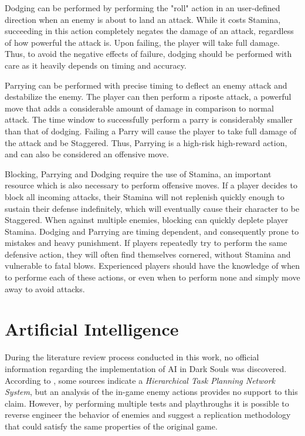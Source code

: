 Dodging can be performed by performing the "roll" action in an user-defined direction when an enemy is about to land an attack. While it costs Stamina, succeeding in this action completely negates the damage of an attack, regardless of how powerful the attack is. Upon failing, the player will take full damage. Thus, to avoid the negative effects of failure, dodging should be performed with care as it heavily depends on timing and accuracy.

Parrying can be performed with precise timing to deflect an enemy attack and destabilize the enemy. The player can then perform a riposte attack, a powerful move that adds a considerable amount of damage in comparison to normal attack. The time window to successfully perform a parry is considerably smaller than that of dodging. Failing a Parry will cause the player to take full damage of the attack and be Staggered. Thus, Parrying is a high-risk high-reward action, and can also be considered an offensive move.

Blocking, Parrying and Dodging require the use of Stamina, an important resource which is also necessary to perform offensive moves. If a player decides to block all incoming attacks, their Stamina will not replenish quickly enough to sustain their defense indefinitely, which will eventually cause their character to be Staggered. When against multiple enemies, blocking can quickly deplete player Stamina. Dodging and Parrying are timing dependent, and consequently prone to mistakes and heavy punishment. If players repeatedly try to perform the same defensive action, they will often find themselves cornered, without Stamina and vulnerable to fatal blows. Experienced players should have the knowledge of when to performe each of these actions, or even when to perform none and simply move away to avoid attacks.


\section{Artificial Intelligence}

During the literature review process conducted in this work, no official information regarding the implementation of AI in Dark Souls was discovered. According to , some sources indicate a \emph{Hierarchical Task Planning Network System}, but an analysis of the in-game enemy actions provides no support to this claim. However, by performing multiple tests and playthroughs it is possible to reverse engineer the behavior of enemies and suggest a replication methodology that could satisfy the same properties of the original game.

